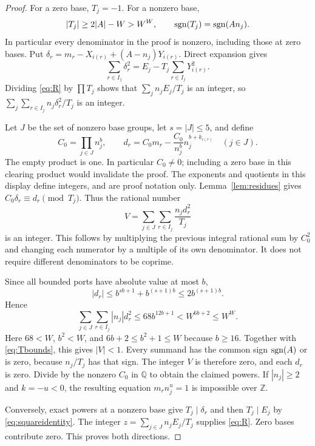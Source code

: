 \documentclass[11pt]{article}
\theoremstyle{definition}\newtheorem{definition}[theorem]{Definition}
\newcommand{\Z}{\mathbb Z}\newcommand{\N}{\mathbb N}
\begin{document}
\begin{proof}
For a zero base, $T_j=-1$. For a nonzero base,
\begin{equation}\label{eq:Tbounds}
 |T_j|\ge2|A|-W>W^W,
 \qquad\operatorname{sgn}(T_j)=\operatorname{sgn}(An_j).
\end{equation}
In particular every denominator in the proof is nonzero, including those
at zero bases. Put $\delta_r=m_r-X_{i(r)}+(A-n_j)Y_{i(r)}$.
Direct expansion gives
\begin{equation}\label{eq:squareidentity}
 \sum_{r\in I_j}\delta_r^2
       =E_j-T_j\sum_{r\in I_j}Y_{i(r)}^2.
\end{equation}
Dividing \eqref{eq:R} by $\prod T_j$ shows that
$\sum_jn_jE_j/T_j$ is an integer, so
$\sum_j\sum_{r\in I_j}n_j\delta_r^2/T_j$ is an integer.

Let $J$ be the set of nonzero base groups, let $s=|J|\le5$, and define
\[
 C_0=\prod_{j\in J}n_j^b,\qquad
 d_r=C_0m_r-\frac{C_0}{n_j^b}n_j^{b+k_{i(r)}}\quad(j\in J).
\]
The empty product is one. In particular $C_0\ne0$; including a zero base
in this clearing product would invalidate the proof. The exponents and
quotients in this display define integers, and are proof notation only.
Lemma~\ref{lem:residues} gives $C_0\delta_r\equiv d_r\pmod{T_j}$.
Thus the rational number
\[
 V=\sum_{j\in J}\sum_{r\in I_j}\frac{n_jd_r^2}{T_j}
\]
is an integer. This follows by multiplying the previous integral rational
sum by $C_0^2$ and changing each numerator by a multiple of its own
denominator. It does not require different denominators to be coprime.

Since all bounded ports have absolute value at most $b$,
\[
 |d_r|\le b^{sb+1}+b^{(s+1)b}\le2b^{(s+1)b}.
\]
Hence
\[
 \sum_{j\in J}\sum_{r\in I_j}|n_j|d_r^2
 \le68b^{12b+1}<W^{6b+2}\le W^W.
\]
Here $68<W$, $b^2<W$, and $6b+2\le b^2+1\le W$ because $b\ge16$.
Together with \eqref{eq:Tbounds}, this gives $|V|<1$. Every summand has
the common sign $\operatorname{sgn}(A)$ or is zero, because $n_j/T_j$ has that sign.
The integer $V$ is therefore zero, and each $d_r$ is zero. Divide by the
nonzero $C_0$ in $\mathbb Q$ to obtain the claimed powers. If $|n_j|\ge2$
and $k=-u<0$, the resulting equation $m_rn_j^u=1$ is impossible over
$\Z$.

Conversely, exact powers at a nonzero base give $T_j\mid\delta_r$ and
then $T_j\mid E_j$ by \eqref{eq:squareidentity}. The integer
$z=\sum_{j\in J}n_jE_j/T_j$ supplies \eqref{eq:R}. Zero bases contribute
zero. This proves both directions.
\end{proof}
\end{document}
